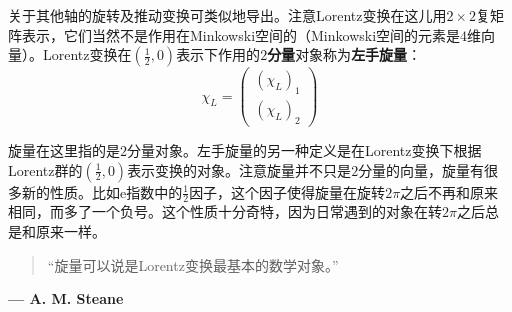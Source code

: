 关于其他轴的旋转及推动变换可类似地导出。注意Lorentz变换在这儿用$2 \times 2$复矩阵表示，它们当然不是作用在Minkowski空间的（Minkowski空间的元素是$4$维向量）。Lorentz变换在$(\frac{1}{2}, 0)$表示下作用的{\bf $2$分量}对象称为{\bf 左手旋量}：
\begin{equation}
\label{equ3.179}
	\chi_L =
		\begin{pmatrix}
			(\chi_L)_1 \\
			(\chi_L)_2
		\end{pmatrix}
\end{equation}

旋量在这里指的是$2$分量对象。左手旋量的另一种定义是在Lorentz变换下根据Lorentz群的$(\frac{1}{2}, 0)$表示变换的对象。注意旋量并不只是$2$分量的向量，旋量有很多新的性质。比如$\mathrm{e}$指数中的$\frac{1}{2}$因子，这个因子使得旋量在旋转$2\pi$之后不再和原来相同，而多了一个负号。这个性质十分奇特，因为日常遇到的对象在转$2\pi$之后总是和原来一样。

\begin{quote}
	“旋量可以说是Lorentz变换最基本的数学对象。”
\end{quote}

\begin{flushright}
{\bf  ---  A. M. Steane}
\end{flushright}

